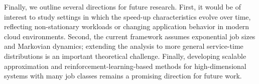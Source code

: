 \documentclass[11pt]{article}
\theoremstyle{remark}
\theoremstyle{definition}
\numberwithin{equation}{section}
\begin{document}
Finally, we outline several directions for future research. First, it would be of interest to study settings in which the speed-up characteristics evolve over time, reflecting non-stationary workloads or changing application behavior in modern cloud environments. Second, the current framework assumes exponential job sizes and Markovian dynamics; extending the analysis to more general service-time distributions is an important theoretical challenge. Finally, developing scalable approximation and reinforcement-learning-based methods for high-dimensional systems with many job classes remains a promising direction for future work.













































\end{document}
